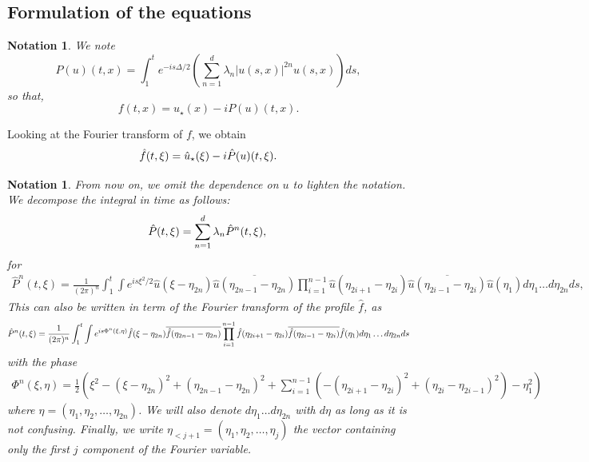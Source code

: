 \documentclass[a4paper, 15pt]{article}
\numberwithin{equation}{section}
\newtheorem{nota}[defi]{Notation}
\begin{document}
\subsection{Formulation of the equations}
\label{subsection:formulation}
\begin{nota}
We note
\begin{equation}
\label{eq:Cterm}
    P(u)(t,x)=\int^t_1e^{-is\Delta/2}(\sum_{n=1}^{d}\lambda_n|u(s,x)|^{2n}u(s,x))ds,
\end{equation}
so that, 
\begin{equation}
\label{eq:NLSduhamf}
    f(t,x)=u_\star(x)-iP(u)(t,x).
\end{equation}
\end{nota}
Looking at the Fourier transform of $f$, we obtain 
\begin{equation}
\label{eq:NLSduhamfFourier}
    \hat{f}(t,\xi)=\hat{u}_\star(\xi)-i\hat{P}(u)(t,\xi).\\
\end{equation}
\begin{nota}
\label{nota:general}
From now on, we omit the dependence on $u$ to lighten the notation. We decompose the integral in time as follows:
\begin{equation}
    \hat{P}(t,\xi)=\sum_{n=1}^{d}\lambda_n\hat{P}^n(t,\xi),\\
\end{equation}
for 
\begin{align}
    \hat{P}^n(t,\xi)=\frac{1}{(2\pi)^n}\int^t_1\int e^{is\xi^2/2}\hat{u}(\xi-\eta_{2n})\overline{\hat{u}(\eta_{2n-1}-\eta_{2n})}\prod^{n-1}_{i=1}\hat{u}(\eta_{2i+1}-\eta_{2i})\overline{\hat{u}(\eta_{2i-1}-\eta_{2i})}\hat{u}(\eta_1)d\eta_1\dots d\eta_{2n}ds,
\end{align}
 This can also be written in term of the Fourier transform of the profile $\hat{f}$, as
\begin{equation}
    \hat{P}^n(t,\xi)=\frac{1}{(2\pi)^n}\int^t_1\int e^{is\Phi^n(\xi,\eta)}\hat{f}(\xi-\eta_{2n})\overline{\hat{f}(\eta_{2n-1}-\eta_{2n})}\prod^{n-1}_{i=1}\hat{f}(\eta_{2i+1}-\eta_{2i})\overline{\hat{f}(\eta_{2i-1}-\eta_{2i})}\hat{f}(\eta_1)d\eta_1\dots d\eta_{2n}ds\\
\end{equation}
with the phase
\begin{align*}
   \Phi^n(\xi,\eta)=\frac{1}{2}(\xi^2-(\xi-\eta_{2n})^2+(\eta_{2n-1}-\eta_{2n})^2+\sum^{n-1}_{i=1}(-(\eta_{2i+1}-\eta_{2i})^2+(\eta_{2i}-\eta_{2i-1})^2)-\eta_1^2)
\end{align*}
where $\eta=(\eta_1,\eta_2,\dots,\eta_{2n})$. We will also denote $d\eta_1\dots d\eta_{2n}$ with $d\eta$ as long as it is not confusing. Finally, we write $\eta_{<j+1}=(\eta_1,\eta_2,\dots,\eta_{j})$ the vector containing only the first $j$ component of the Fourier variable. \\
\end{nota}
\end{document}
